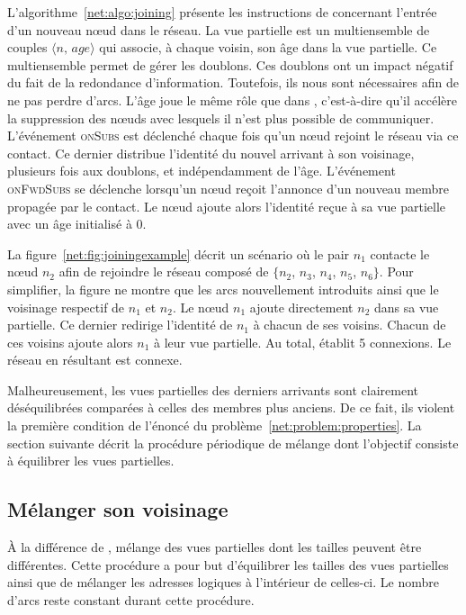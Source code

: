 L'algorithme~\ref{net:algo:joining} présente les instructions de \SPRAY
concernant l'entrée d'un nouveau nœud dans le réseau. La vue partielle est un
multiensemble de couples $\langle n,\, age\rangle$ qui associe, à chaque voisin,
son âge dans la vue partielle. Ce multiensemble permet de gérer les
doublons. Ces doublons ont un impact négatif du fait de la redondance
d'information.  Toutefois, ils nous sont nécessaires afin de ne pas perdre
d'arcs. L'âge joue le même rôle que dans \CYCLON, c'est-à-dire qu'il accélère la
suppression des nœuds avec lesquels il n'est plus possible de
communiquer. L'événement \textsc{onSubs} est déclenché chaque fois qu'un nœud
rejoint le réseau via ce contact. Ce dernier distribue l'identité du nouvel
arrivant à son voisinage, plusieurs fois aux doublons, et indépendamment de
l'âge. L'événement \textsc{onFwdSubs} se déclenche lorsqu'un nœud reçoit
l'annonce d'un nouveau membre propagée par le contact. Le nœud ajoute alors
l'identité reçue à sa vue partielle avec un âge initialisé à $0$.

La figure~\ref{net:fig:joiningexample} décrit un scénario où le pair $n_1$
contacte le nœud $n_2$ afin de rejoindre le réseau composé de $\{n_2$, $n_3$,
$n_4$, $n_5$, $n_6\}$. Pour simplifier, la figure ne montre que les arcs
nouvellement introduits ainsi que le voisinage respectif de $n_1$ et $n_2$. Le
nœud $n_1$ ajoute directement $n_2$ dans sa vue partielle. Ce dernier redirige
l'identité de $n_1$ à chacun de ses voisins.  Chacun de ces voisins ajoute alors
$n_1$ à leur vue partielle. Au total, \SPRAY établit 5 connexions. Le réseau en
résultant est connexe.

Malheureusement, les vues partielles des derniers arrivants sont clairement
déséquilibrées comparées à celles des membres plus anciens. De ce fait, ils
violent la première condition de l'énoncé du
problème~\ref{net:problem:properties}. La section suivante décrit la procédure
périodique de mélange dont l'objectif consiste à équilibrer les vues partielles.

\subsection{Mélanger son voisinage}
\label{net:subsec:shuffling}

À la différence de \CYCLON, \SPRAY mélange des vues partielles dont les tailles
peuvent être différentes. Cette procédure a pour but d'équilibrer les tailles
des vues partielles ainsi que de mélanger les adresses logiques à l'intérieur de
celles-ci. Le nombre d'arcs reste constant durant cette procédure.

